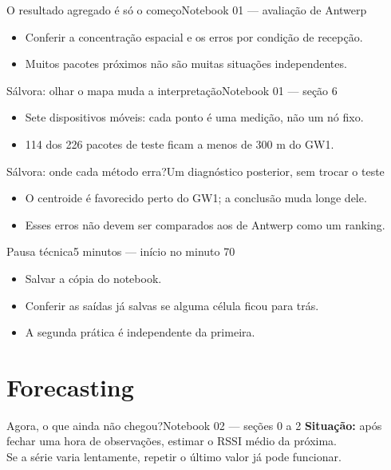 \begin{frame}{O resultado agregado é só o começo}{Notebook 01 — avaliação de Antwerp}
\begin{itemize}
\item Conferir a concentração espacial e os erros por condição de recepção.
\item Muitos pacotes próximos não são muitas situações independentes.
\end{itemize}
\end{frame}

\begin{frame}{Sálvora: olhar o mapa muda a interpretação}{Notebook 01 — seção 6}
\begin{itemize}
\item Sete dispositivos móveis: cada ponto é uma medição, não um nó fixo.
\item 114 dos 226 pacotes de teste ficam a menos de 300 m do GW1.
\end{itemize}
\end{frame}

\begin{frame}{Sálvora: onde cada método erra?}{Um diagnóstico posterior, sem trocar o teste}
\begin{itemize}
\item O centroide é favorecido perto do GW1; a conclusão muda longe dele.
\item Esses erros não devem ser comparados aos de Antwerp como um ranking.
\end{itemize}
\end{frame}

\begin{frame}{Pausa técnica}{5 minutos — início no minuto 70}
\begin{itemize}
\item Salvar a cópia do notebook.
\item Conferir as saídas já salvas se alguma célula ficou para trás.
\item A segunda prática é independente da primeira.
\end{itemize}
\end{frame}

\section{Forecasting}
\begin{frame}{Agora, o que ainda não chegou?}{Notebook 02 — seções 0 a 2}
\textbf{Situação:} após fechar uma hora de observações, estimar o RSSI médio da próxima.\\
Se a série varia lentamente, repetir o último valor já pode funcionar.
\end{frame}

